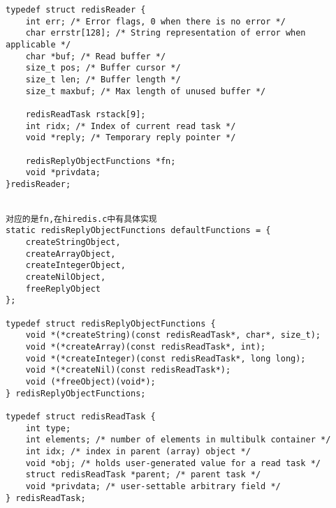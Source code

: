 \documentclass[a4paper,10pt]{article}
\begin{document}
\begin{CJK*}{UTF8}{gkai}
\begin{verbatim}
typedef struct redisReader {
    int err; /* Error flags, 0 when there is no error */
    char errstr[128]; /* String representation of error when applicable */
    char *buf; /* Read buffer */
    size_t pos; /* Buffer cursor */
    size_t len; /* Buffer length */
    size_t maxbuf; /* Max length of unused buffer */

    redisReadTask rstack[9];
    int ridx; /* Index of current read task */
    void *reply; /* Temporary reply pointer */

    redisReplyObjectFunctions *fn;
    void *privdata;
}redisReader;


对应的是fn,在hiredis.c中有具体实现
static redisReplyObjectFunctions defaultFunctions = {
    createStringObject,
    createArrayObject,
    createIntegerObject,
    createNilObject,
    freeReplyObject
};

typedef struct redisReplyObjectFunctions {
    void *(*createString)(const redisReadTask*, char*, size_t);
    void *(*createArray)(const redisReadTask*, int);
    void *(*createInteger)(const redisReadTask*, long long);
    void *(*createNil)(const redisReadTask*);
    void (*freeObject)(void*);
} redisReplyObjectFunctions;

typedef struct redisReadTask {
    int type;
    int elements; /* number of elements in multibulk container */
    int idx; /* index in parent (array) object */
    void *obj; /* holds user-generated value for a read task */
    struct redisReadTask *parent; /* parent task */
    void *privdata; /* user-settable arbitrary field */
} redisReadTask;



\end{verbatim}


\end{CJK*}
\end{document}

